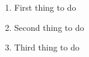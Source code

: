 \documentclass{article}
\begin{document}
\begin{enumerate}[Step h\'e 1:]
\item First thing to do
\item Second thing to do
\item Third thing to do
\end{enumerate}
\end{document}
